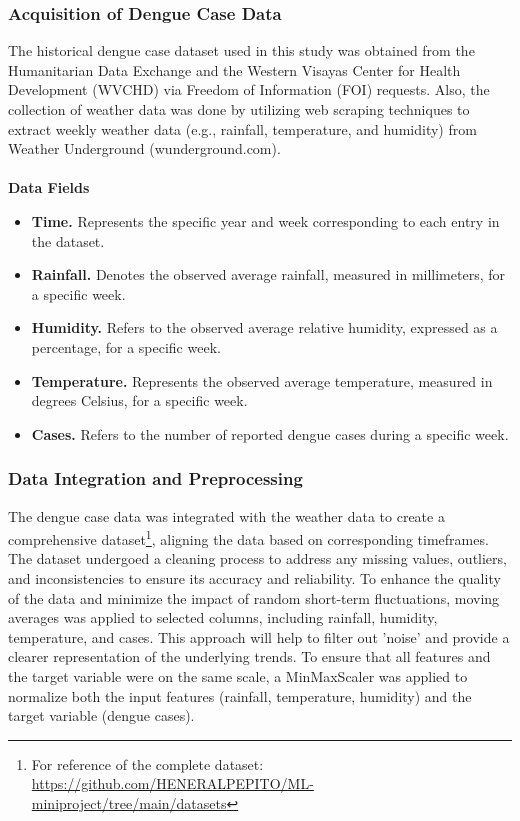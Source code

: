 \documentclass[runningheads]{llncs}
\begin{document}
\subsubsection{Acquisition of Dengue Case Data}
The historical dengue case dataset used in this study was obtained from the Humanitarian Data Exchange and the Western Visayas Center for Health Development (WVCHD) via Freedom of Information (FOI) requests. Also, the collection of weather data was done by utilizing web scraping techniques to extract weekly weather data (e.g., rainfall, temperature, and humidity) from Weather Underground (wunderground.com).
\\
\\
\textbf{Data Fields}
\begin{itemize}
    \item \textbf{Time.} Represents the specific year and week corresponding to each entry in the dataset.
    \item \textbf{Rainfall.} Denotes the observed average rainfall, measured in millimeters, for a specific week.
    \item \textbf{Humidity.} Refers to the observed average relative humidity, expressed as a percentage, for a specific week.    
    \item \textbf{Temperature.} Represents the observed average temperature, measured in degrees Celsius, for a specific week.
    \item \textbf{Cases.} Refers to the number of reported dengue cases during a specific week.
\end{itemize} 

\subsubsection{Data Integration and Preprocessing}
The dengue case data was integrated with the weather data to create a comprehensive dataset\footnote{For reference of the complete dataset:\\ 
	\url{https://github.com/HENERALPEPITO/ML-miniproject/tree/main/datasets}}, aligning the data based on corresponding timeframes. The dataset undergoed a cleaning process to address any missing values, outliers, and inconsistencies to ensure its accuracy and reliability. To enhance the quality of the data and minimize the impact of random short-term fluctuations, moving averages was applied to selected columns, including rainfall, humidity, temperature, and cases. This approach will help to filter out 'noise' and provide a clearer representation of the underlying trends. To ensure that all features and the target variable were on the same scale, a MinMaxScaler was applied to normalize both the input features (rainfall, temperature, humidity) and the target variable (dengue cases). 
\end{document}
